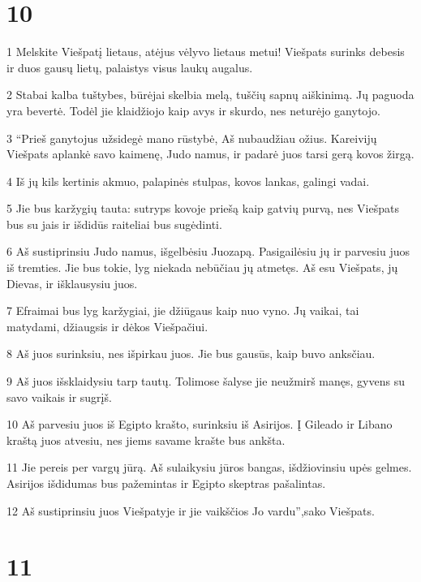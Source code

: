 \chapter{10}


\par 1 Melskite Viešpatį lietaus, atėjus vėlyvo lietaus metui! Viešpats surinks debesis ir duos gausų lietų, palaistys visus laukų augalus. 
\par 2 Stabai kalba tuštybes, būrėjai skelbia melą, tuščių sapnų aiškinimą. Jų paguoda yra bevertė. Todėl jie klaidžiojo kaip avys ir skurdo, nes neturėjo ganytojo. 
\par 3 “Prieš ganytojus užsidegė mano rūstybė, Aš nubaudžiau ožius. Kareivijų Viešpats aplankė savo kaimenę, Judo namus, ir padarė juos tarsi gerą kovos žirgą. 
\par 4 Iš jų kils kertinis akmuo, palapinės stulpas, kovos lankas, galingi vadai. 
\par 5 Jie bus karžygių tauta: sutryps kovoje priešą kaip gatvių purvą, nes Viešpats bus su jais ir išdidūs raiteliai bus sugėdinti. 
\par 6 Aš sustiprinsiu Judo namus, išgelbėsiu Juozapą. Pasigailėsiu jų ir parvesiu juos iš tremties. Jie bus tokie, lyg niekada nebūčiau jų atmetęs. Aš esu Viešpats, jų Dievas, ir išklausysiu juos. 
\par 7 Efraimai bus lyg karžygiai, jie džiūgaus kaip nuo vyno. Jų vaikai, tai matydami, džiaugsis ir dėkos Viešpačiui. 
\par 8 Aš juos surinksiu, nes išpirkau juos. Jie bus gausūs, kaip buvo anksčiau. 
\par 9 Aš juos išsklaidysiu tarp tautų. Tolimose šalyse jie neužmirš manęs, gyvens su savo vaikais ir sugrįš. 
\par 10 Aš parvesiu juos iš Egipto krašto, surinksiu iš Asirijos. Į Gileado ir Libano kraštą juos atvesiu, nes jiems savame krašte bus ankšta. 
\par 11 Jie pereis per vargų jūrą. Aš sulaikysiu jūros bangas, išdžiovinsiu upės gelmes. Asirijos išdidumas bus pažemintas ir Egipto skeptras pašalintas. 
\par 12 Aš sustiprinsiu juos Viešpatyje ir jie vaikščios Jo vardu”,­sako Viešpats.



\chapter{11}


